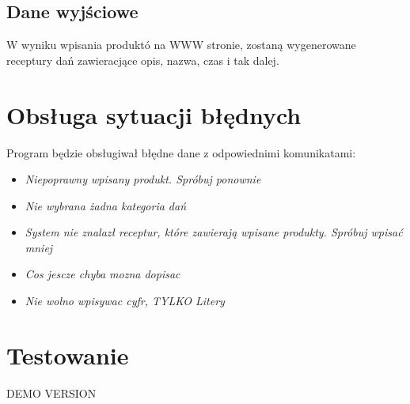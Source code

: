 \documentclass[a4paper, 12pt]{article}
\begin{document}
		\subsection{Dane wyjściowe}
			\hspace*{1cm} W wyniku wpisania produktó na WWW stronie, zostaną  wygenerowane receptury dań zawieracjące opis, nazwa, czas i tak dalej.
\newpage
	\section{Obsługa sytuacji błędnych}
		\hspace{1cm} Program będzie obsługiwał błędne dane z odpowiednimi komunikatami:
		\renewcommand{\labelitemi}{$\ast$}
		
		\begin{itemize}
			\item \textit{Niepoprawny wpisany produkt. Spróbuj ponownie}
 			\item \textit{Nie wybrana żadna kategoria dań}
 			\item \textit{System nie znalazł receptur, które zawierają wpisane produkty. Spróbuj wpisać mniej}
 			\item \textit{Cos jescze chyba mozna dopisac}
 			\item \textit{Nie wolno wpisywac cyfr, TYLKO Litery}
		\end{itemize}
	\section{Testowanie}
		\hspace{1cm} DEMO VERSION 
\label{LastPage}~
\label{LastPageOfBackMatter}~		
\end{document}
